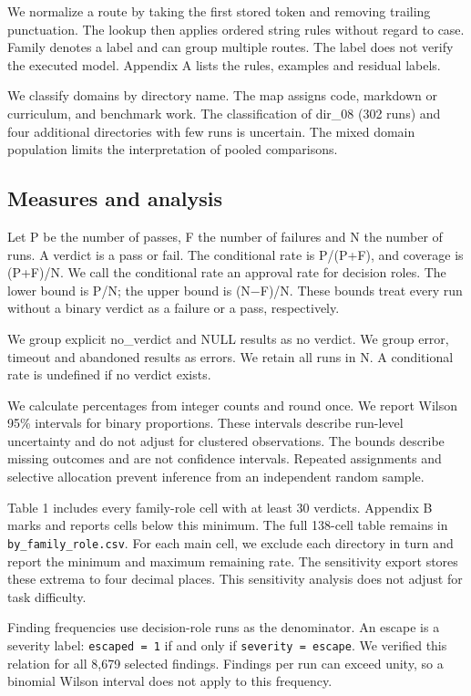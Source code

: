 \documentclass[
  10pt,
  a4paper,
]{article}
\begin{document}
We normalize a route by taking the first stored token and removing
trailing punctuation. The lookup then applies ordered string rules
without regard to case. Family denotes a label and can group multiple
routes. The label does not verify the executed model. Appendix A lists
the rules, examples and residual labels.

We classify domains by directory name. The map assigns code, markdown or
curriculum, and benchmark work. The classification of dir\_08 (302 runs)
and four additional directories with few runs is uncertain. The mixed
domain population limits the interpretation of pooled comparisons.

\subsection{Measures and analysis}\label{measures-and-analysis}

Let P be the number of passes, F the number of failures and N the number
of runs. A verdict is a pass or fail. The conditional rate is P/(P+F),
and coverage is (P+F)/N. We call the conditional rate an approval rate
for decision roles. The lower bound is P/N; the upper bound is (N−F)/N.
These bounds treat every run without a binary verdict as a failure or a
pass, respectively.

We group explicit no\_verdict and NULL results as no verdict. We group
error, timeout and abandoned results as errors. We retain all runs in N.
A conditional rate is undefined if no verdict exists.

We calculate percentages from integer counts and round once. We report
Wilson 95\% intervals for binary proportions. These intervals describe
run-level uncertainty and do not adjust for clustered observations. The
bounds describe missing outcomes and are not confidence intervals.
Repeated assignments and selective allocation prevent inference from an
independent random sample.

Table 1 includes every family-role cell with at least 30 verdicts.
Appendix B marks and reports cells below this minimum. The full 138-cell
table remains in \texttt{by\_family\_role.csv}. For each main cell, we
exclude each directory in turn and report the minimum and maximum
remaining rate. The sensitivity export stores these extrema to four
decimal places. This sensitivity analysis does not adjust for task
difficulty.

Finding frequencies use decision-role runs as the denominator. An escape
is a severity label: \texttt{escaped\ =\ 1} if and only if
\texttt{severity\ =\ escape}. We verified this relation for all 8,679
selected findings. Findings per run can exceed unity, so a binomial
Wilson interval does not apply to this frequency.
\end{document}
